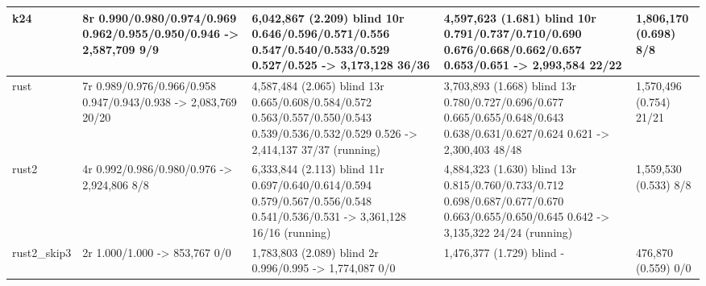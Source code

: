\documentclass[10pt,a4paper]{article}
\begin{document}
{\begin{longtable}{|p{1.1cm}|p{3.15cm}|p{4.77cm}|p{4.77cm}|p{1.74cm}|}
k24 & 8r 0.990/\allowbreak{}0.980/\allowbreak{}0.974/\allowbreak{}0.969 0.962/\allowbreak{}0.955/\allowbreak{}0.950/\allowbreak{}0.946 -\textgreater{} 2,587,709 9/\allowbreak{}9 & 6,042,867 (2.209) blind 10r 0.646/\allowbreak{}0.596/\allowbreak{}0.571/\allowbreak{}0.556 0.547/\allowbreak{}0.540/\allowbreak{}0.533/\allowbreak{}0.529 0.527/\allowbreak{}0.525 -\textgreater{} 3,173,128 36/\allowbreak{}36 & 4,597,623 (1.681) blind 10r 0.791/\allowbreak{}0.737/\allowbreak{}0.710/\allowbreak{}0.690 0.676/\allowbreak{}0.668/\allowbreak{}0.662/\allowbreak{}0.657 0.653/\allowbreak{}0.651 -\textgreater{} 2,993,584 22/\allowbreak{}22 & 1,806,170 (0.698) 8/\allowbreak{}8\\\hline
rust & 7r 0.989/\allowbreak{}0.976/\allowbreak{}0.966/\allowbreak{}0.958 0.947/\allowbreak{}0.943/\allowbreak{}0.938 -\textgreater{} 2,083,769 20/\allowbreak{}20 & 4,587,484 (2.065) blind 13r 0.665/\allowbreak{}0.608/\allowbreak{}0.584/\allowbreak{}0.572 0.563/\allowbreak{}0.557/\allowbreak{}0.550/\allowbreak{}0.543 0.539/\allowbreak{}0.536/\allowbreak{}0.532/\allowbreak{}0.529 0.526 -\textgreater{} 2,414,137 37/\allowbreak{}37 (running) & 3,703,893 (1.668) blind 13r 0.780/\allowbreak{}0.727/\allowbreak{}0.696/\allowbreak{}0.677 0.665/\allowbreak{}0.655/\allowbreak{}0.648/\allowbreak{}0.643 0.638/\allowbreak{}0.631/\allowbreak{}0.627/\allowbreak{}0.624 0.621 -\textgreater{} 2,300,403 48/\allowbreak{}48 & 1,570,496 (0.754) 21/\allowbreak{}21\\\hline
rust2 & 4r 0.992/\allowbreak{}0.986/\allowbreak{}0.980/\allowbreak{}0.976 -\textgreater{} 2,924,806 8/\allowbreak{}8 & 6,333,844 (2.113) blind 11r 0.697/\allowbreak{}0.640/\allowbreak{}0.614/\allowbreak{}0.594 0.579/\allowbreak{}0.567/\allowbreak{}0.556/\allowbreak{}0.548 0.541/\allowbreak{}0.536/\allowbreak{}0.531 -\textgreater{} 3,361,128 16/\allowbreak{}16 (running) & 4,884,323 (1.630) blind 13r 0.815/\allowbreak{}0.760/\allowbreak{}0.733/\allowbreak{}0.712 0.698/\allowbreak{}0.687/\allowbreak{}0.677/\allowbreak{}0.670 0.663/\allowbreak{}0.655/\allowbreak{}0.650/\allowbreak{}0.645 0.642 -\textgreater{} 3,135,322 24/\allowbreak{}24 (running) & 1,559,530 (0.533) 8/\allowbreak{}8\\\hline
rust2\_skip3 & 2r 1.000/\allowbreak{}1.000 -\textgreater{} 853,767 0/\allowbreak{}0 & 1,783,803 (2.089) blind 2r 0.996/\allowbreak{}0.995 -\textgreater{} 1,774,087 0/\allowbreak{}0 & 1,476,377 (1.729) blind - & 476,870 (0.559) 0/\allowbreak{}0\\\hline
\end{longtable}}
\end{document}
